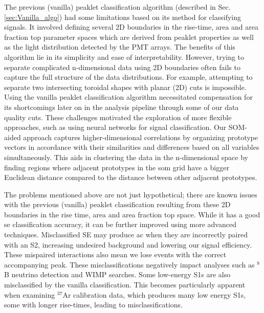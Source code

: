 

The previous (vanilla) peaklet classification algorithm (described in Sec. \ref{sec:Vanilla_algo}) had some limitations based on its method for classifying signals. It involved defining several 2D boundaries in the rise-time, area and area fraction top parameter spaces which are derived from peaklet properties as well as the light distribution detected by the PMT arrays. The benefits of this algorithm lie in its simplicity and ease of interpretability. However, trying to separate complicated n-dimensional data using 2D boundaries often fails to capture the full structure of the data distributions. For example, attempting to separate two intersecting toroidal shapes with planar (2D) cuts is impossible. Using the vanilla peaklet classification algorithm necessitated compensation for its shortcomings later on in the analysis pipeline through some of our data quality cuts. These challenges motivated the exploration of more flexible approaches, such as using neural networks for signal classification.
Our SOM-aided approach captures higher-dimensional correlations by organizing prototype vectors in accordance with their similarities and differences based on all variables simultaneously. This aids in clustering the data in the n-dimensional space by finding regions where adjacent prototypes in the \acrshort{som} grid have a bigger Euclidean distance compared to the distance between other adjacent prototypes.

The problems mentioned above are not just hypothetical; there are known issues with the previous (vanilla) peaklet classification resulting from these 2D boundaries in the rise time, area and area fraction top space. While it has a good \acrfull{se} classification accuracy, it can be further improved using more advanced techniques. 
Misclassified SE may produce  \acrfull{ac} when they are incorrectly paired with an S2, increasing undesired background and lowering our signal efficiency. These mispaired interactions also mean we lose events with the correct accompanying peak. These misclassifications negatively impact analyses such as $^8$B neutrino detection and WIMP searches. Some low-energy S1s are also misclassified by the vanilla classification. This becomes particularly apparent when examining $^{37}$Ar calibration data, which produces many low energy S1s, some with longer rise-times, leading to misclassifications. 

